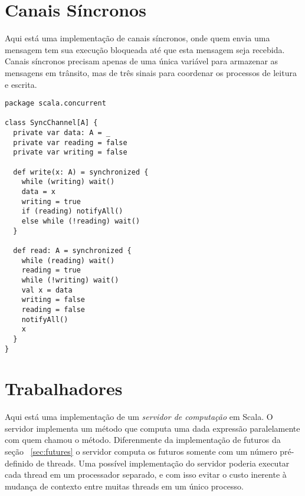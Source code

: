 \section{Canais Síncronos}

Aqui está uma implementação de canais síncronos, onde quem envia uma mensagem tem sua execução bloqueada até que esta mensagem seja recebida.
Canais síncronos precisam apenas de uma única variável para armazenar as mensagens em trânsito, mas de três sinais para coordenar os processos de leitura e escrita.
\begin{lstlisting}
package scala.concurrent

class SyncChannel[A] {
  private var data: A = _
  private var reading = false
  private var writing = false

  def write(x: A) = synchronized {
    while (writing) wait()
    data = x
    writing = true
    if (reading) notifyAll()
    else while (!reading) wait()
  }

  def read: A = synchronized {
    while (reading) wait()
    reading = true
    while (!writing) wait()
    val x = data
    writing = false
    reading = false
    notifyAll()
    x
  }
}
\end{lstlisting}

\section{Trabalhadores}

Aqui está uma implementação de um {\em servidor de computação} em Scala. O servidor implementa um método  que computa uma dada expressão paralelamente com quem chamou o método. Diferenmente da implementação de futuros da seção ~\ref{sec:futures} o servidor computa os futuros somente com um número pré-definido de threads. Uma possível implementação do servidor poderia executar cada thread em um processador separado, e com isso evitar o custo inerente à mudança de contexto entre muitas threads em um único processo.

